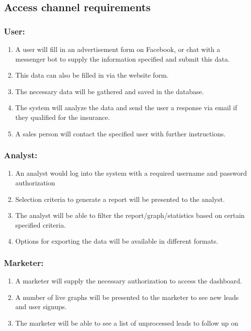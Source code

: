 \documentclass{article}
\begin{document}
	\subsection{Access channel requirements}
\subsubsection{User:}
	\begin{enumerate}
		\item A user will fill in an advertisement form on Facebook, or chat with a messenger bot to supply the information specified and submit this data.
		\item This data can also be filled in via the website form.
		\item The necessary data will be gathered and saved in the database.
		\item The system will analyze the data and send the user a response via email if they qualified for the insurance.
		\item A sales person will contact the specified user with further instructions.
	\end{enumerate}
\subsubsection{Analyst:}
	\begin{enumerate}
		\item An analyst would log into the system with a required username and password authorization
		\item Selection criteria to generate a report will be presented to the analyst.
		\item The analyst will be able to filter the report/graph/statistics based on certain specified criteria.
		\item Options for exporting the data will be available in different formats.
	\end{enumerate}
\subsubsection{Marketer:}
	\begin{enumerate}
		\item A marketer will supply the necessary  authorization to access the dashboard.
		\item A number of live graphs will be presented to the marketer to see new leads and user signups.
		\item The marketer will be able to see a list of unprocessed leads to follow up on
	\end{enumerate}	
\end{document}
